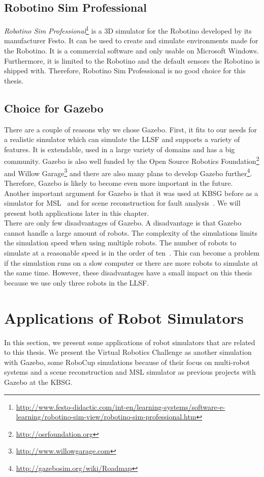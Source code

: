 \subsection{Robotino Sim Professional}
\textit{Robotino Sim Professional}\footnote{\url{http://www.festo-didactic.com/int-en/learning-systems/software-e-learning/robotino-sim-view/robotino-sim-professional.htm}} is a 3D simulator for the Robotino developed by its manufacturer Festo. It can be used to create and simulate environments made for the Robotino. It is a commercial software and only usable on Microsoft Windows. Furthermore, it is limited to the Robotino and the default sensors the Robotino is shipped with. Therefore, Robotino Sim Professional is no good choice for this thesis.

\subsection{Choice for Gazebo}
There are a couple of reasons why we chose Gazebo. First, it fits to our needs for a realistic simulator which can simulate the LLSF and supports a variety of features. It is extendable, used in a large variety of domains and has a big community. Gazebo is also well funded by the Open Source Robotics Foundation\footnote{\url{http://osrfoundation.org}} and Willow Garage\footnote{\url{http://www.willowgarage.com}} and there are also many plans to develop Gazebo further\footnote{\url{http://gazebosim.org/wiki/Roadmap}}. Therefore, Gazebo is likely to become even more important in the future.\\
Another important argument for Gazebo is that it was used at KBSG before as a simulator for MSL~\cite{MultiLevelAbstraction} and for scene reconstruction for fault analysis~\cite{KlingenDA}. We will present both applications later in this chapter.\\
There are only few disadvantages of Gazebo. A disadvantage is that Gazebo cannot handle a large amount of robots. The complexity of the simulations limits the simulation speed when using multiple robots. The number of robots to simulate at a reasonable speed is in the order of ten~\cite{GazeboDesign}. This can become a problem if the simulation runs on a slow computer or there are more robots to simulate at the same time. However, these disadvantages have a small impact on this thesis because we use only three robots in the LLSF.

\section{Applications of Robot Simulators}
\label{sec:simulations}
In this section, we present some applications of robot simulators that are related to this thesis. We present the Virtual Robotics Challenge as another simulation with Gazebo, some RoboCup simulations because of their focus on multi-robot systems and a scene reconstruction and MSL simulator as previous projects with Gazebo at the KBSG.

